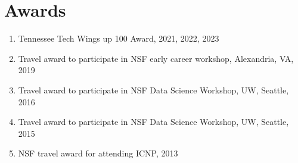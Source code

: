 \section*{Awards}
\begin{enumerate}
\item Tennessee Tech Wings up 100 Award, 2021, 2022, 2023
\item Travel award to participate in NSF early career workshop, Alexandria, VA, 2019
\item Travel award to participate in NSF Data Science Workshop, UW, Seattle, 2016
\item Travel award to participate in NSF Data Science Workshop, UW, Seattle, 2015
\item NSF travel award for attending ICNP, 2013
\end{enumerate}

